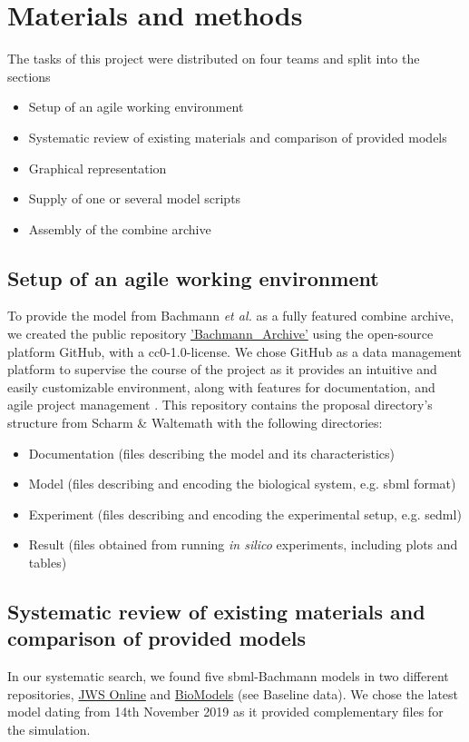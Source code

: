 \section*{Materials and methods} \label{sec:matmet}

The tasks of this project were distributed on  four teams and split into the sections 
\begin{itemize}
    \item Setup of an agile working environment
    \item Systematic review of existing materials and comparison of provided models
    \item Graphical representation
    \item Supply of one or several model scripts
    \item Assembly of the \acs{combine} archive
\end{itemize}

\subsection*{Setup of an agile working environment} \label{setupagwork}
To provide the model from Bachmann \textit{et al.} \cite{bachmannmodel} as a fully featured \ac{combine} archive, we created the public repository  \hyperlink{https://github.com/ahodelin/Bachmann_Archive}{'Bachmann\_Archive'} using the open-source platform GitHub, with a \ac{cc}0-1.0-license. We chose GitHub as a data management platform to supervise the course of the project as it provides an intuitive and easily customizable environment, along with features for documentation, and agile project management \cite{github}. This repository contains the proposal directory's structure from Scharm \& Waltemath \cite{combine} with the following directories:
\begin{itemize}
    \item Documentation (files describing the model and its characteristics)
    \item Model (files describing and encoding the biological system, e.g. \ac{sbml} format)
    \item Experiment (files describing and encoding the experimental setup, e.g. \ac{sedml})
    \item Result (files obtained from running \textit{in silico} experiments, including plots and tables)
\end{itemize}

\subsection*{Systematic review of existing materials and comparison of provided models}
In our systematic search, we found five \ac{sbml}-Bachmann models in two different repositories, \hyperlink{https://www.systemsmedicine.net/posts/jws-online-biological-systems-modelling}{JWS Online} and \hyperlink{https://www.ebi.ac.uk/biomodels/}{BioModels} (see Baseline data). We chose the latest model dating from 14th November 2019 as it provided complementary files for the simulation.

